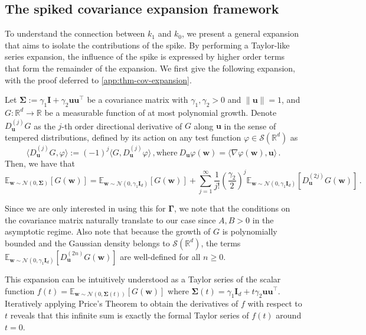 \subsection{The spiked covariance expansion framework}
To understand the connection between $k_1$ and $k_0$, we present a general expansion that aims to isolate the contributions of the spike. By performing a Taylor-like series expansion, the influence of the spike is expressed by higher order terms that form the remainder of the expansion. We first give the following expansion, with the proof deferred to \cref{app:thm-cov-expansion}.
\begin{theorem}\label{thm:cov-expansion}
    Let $\bm \Sigma := \gamma_1\bm I + \gamma_2 \bm u \bm u^\top$ be a covariance matrix with $\gamma_1, \gamma_2 > 0$ and $\|\bm u\|= 1$, and \(G:\mathbb R^d \to \mathbb R\) be a measurable function of at most polynomial growth. Denote $D_{\bm u}^{(j)} G$ as the $j$-th order directional derivative of $G$ along $\bm u$ in the sense of tempered distributions, defined by its action on any test function $\varphi \in \mathcal{S}(\mathbb{R}^d)$ as
    \[
        \langle D_{\bm u}^{(j)} G, \varphi \rangle := (-1)^j \langle G, D_{\bm{u}}^{(j)} \varphi \rangle\, , \text{where} \  D_{\bm{u}}\varphi(\bm {w}) = \langle \nabla \varphi(\bm{w}), \bm {u} \rangle\, .
    \]
    Then, we have that
    \[
        \mathbb E_{\bm w \sim \mathcal N(0, \bm \Sigma)}[G(\bm w)] = \mathbb{E}_{\bm w \sim \mathcal N(0, \gamma_1\bm I_d)}[G(\bm{w})] + \sum_{j=1}^\infty \frac{1}{j!}\left(\frac{\gamma_2}{2}\right)^j \mathbb{E}_{\bm w \sim \mathcal N(0, \gamma_1\bm I_d)}[ D_{\bm u}^{(2j)} G(\bm{w})]\,.
    \]    
\end{theorem}

\begin{remark}\label{rmk:well-defined-derivs}
Since we are only interested in using this for $\bm \Gamma$, we note that the conditions on the covariance matrix naturally translate to our case since $A, B > 0$ in the asymptotic regime.
Also note that because the growth of $G$ is polynomially bounded and the Gaussian density belongs to $\mathcal{S}(\mathbb{R}^d)$, the terms $\mathbb{E}_{\bm w \sim \mathcal N(0, \gamma_1\bm I_d)}[ D_{\bm u}^{(2n)} G(\bm{w})]$ are well-defined for all $n \geq 0$.
\end{remark}

\begin{remark}
    This expansion can be intuitively understood as a Taylor series of the scalar function $f(t) = \mathbb{E}_{\bm w \sim \mathcal{N}(0, \bm \Sigma(t))}[G(\bm w)]$ where $\bm \Sigma(t) = \gamma_1\bm{I}_d + t\gamma_2\bm u\bm u^\top$. Iteratively applying Price's Theorem \citep{Price1958,McMahonPrice1964} to obtain the derivatives of $f$ with respect to $t$ reveals that this infinite sum is exactly the formal Taylor series of $f(t)$ around $t = 0$. 
\end{remark}


